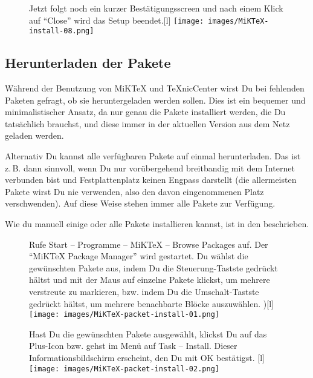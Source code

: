 \begin{figure}[th]
	\begin{captionbeside}{Jetzt folgt noch ein kurzer Bestätigungsscreen und nach einem Klick auf \enquote{Close} wird das Setup beendet.}[l]
		\texttt{[image: images/MiKTeX-install-08.png]}
	\end{captionbeside}
	\label{fig:install08}
\end{figure}

\clearpage %

\subsection{Herunterladen der Pakete}
\label{subsec:instpakete}

Während der Benutzung von MiKTeX und TeXnicCenter wirst Du bei fehlenden Paketen gefragt, ob sie heruntergeladen werden sollen. Dies ist ein bequemer und minimalistischer Ansatz, da nur genau die Pakete installiert werden, die Du tatsächlich brauchst, und diese immer in der aktuellen Version aus dem Netz geladen werden. 

Alternativ Du kannst alle verfügbaren Pakete auf einmal herunterladen. Das ist z.\,B. dann sinnvoll, wenn Du nur vorübergehend breitbandig mit dem Internet verbunden bist und Festplattenplatz keinen Engpass darstellt (die allermeisten Pakete wirst Du nie verwenden, also den davon eingenommenen Platz verschwenden). Auf diese Weise stehen immer alle Pakete zur Verfügung.

Wie du manuell einige oder alle Pakete installieren kannst, ist in den  beschrieben. 

\begin{figure}[hb]
	\begin{captionbeside}{%
			Rufe Start -- Programme -- MiKTeX -- Browse Packages auf. 
			Der \enquote{MiKTeX Package Manager} wird gestartet. 
			Du wählst die gewünschten Pakete aus, indem Du die Steuerung-Tastste gedrückt hältst und mit der Maus auf einzelne Pakete klickst, um mehrere verstreute zu markieren, bzw. indem Du die Umschalt-Tastste gedrückt hältst, um mehrere benachbarte Blöcke auszuwählen.%
			\label{fig:install10})}[l]
		\texttt{[image: images/MiKTeX-packet-install-01.png]}
	\end{captionbeside}
\end{figure}

\begin{figure}[hb]
	\begin{captionbeside}{%
			Hast Du die gewünschten Pakete ausgewählt, klickst Du auf das Plus-Icon bzw. gehst im Menü auf Task -- Install. 
			Dieser Informationsbildschirm erscheint, den Du mit OK bestätigst.%
		\label{fig:install03b}}[l]
		\texttt{[image: images/MiKTeX-packet-install-02.png]}
	\end{captionbeside}
\end{figure}

